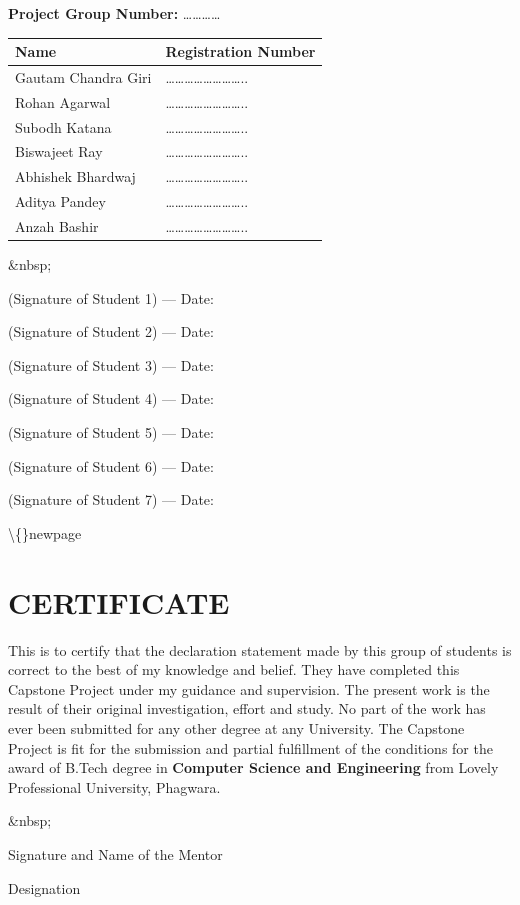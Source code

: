 \documentclass[12pt, a4paper]{report}
\begin{document}
\textbf{Project Group Number:} …………

\begin{table}[htbp]
\centering
\small
\begin{tabularx}{\textwidth}{|X|X|}
\hline
Name & Registration Number \\
\hline
Gautam Chandra Giri & …………………….. \\
Rohan Agarwal & …………………….. \\
Subodh Katana & …………………….. \\
Biswajeet Ray & …………………….. \\
Abhishek Bhardwaj & …………………….. \\
Aditya Pandey & …………………….. \\
Anzah Bashir & …………………….. \\
\hline
\end{tabularx}
\end{table}

\&nbsp;

(Signature of Student 1) --- Date:

(Signature of Student 2) --- Date:

(Signature of Student 3) --- Date:

(Signature of Student 4) --- Date:

(Signature of Student 5) --- Date:

(Signature of Student 6) --- Date:

(Signature of Student 7) --- Date:

\textbackslash\{\}newpage

\section{CERTIFICATE}
This is to certify that the declaration statement made by this group of students is correct to the best of my knowledge and belief. They have completed this Capstone Project under my guidance and supervision. The present work is the result of their original investigation, effort and study. No part of the work has ever been submitted for any other degree at any University. The Capstone Project is fit for the submission and partial fulfillment of the conditions for the award of B.Tech degree in \textbf{Computer Science and Engineering} from Lovely Professional University, Phagwara.

\&nbsp;

Signature and Name of the Mentor

Designation
\end{document}
